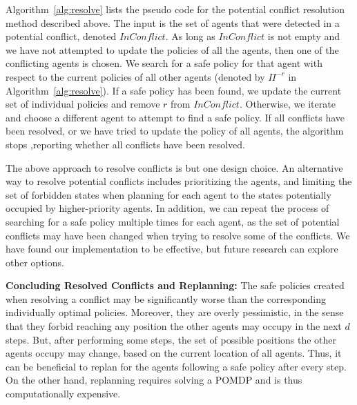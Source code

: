 \documentclass[letterpaper]{article} %
\newcommand{\inconflict}{\textit{InConflict}}
\newcommand{\roni}[1]{ }
\begin{document}
Algorithm~\ref{alg:resolve} lists the pseudo code for the potential conflict resolution method described above.
The input is the set of agents that were detected in a potential conflict, denoted $\inconflict$.
As long as $\inconflict$ is not empty and we have not attempted to update the policies of all the agents,
then one of the conflicting agents is chosen.
We search for a safe policy for that agent with respect to the current policies of all other agents (denoted by $\Pi^{-r}$ in Algorithm~\ref{alg:resolve}).
If a safe policy has been found, we update the current set of individual policies and remove $r$ from $\inconflict$.
Otherwise, we iterate and choose a different agent to attempt to find a safe policy.
If all conflicts have been resolved, or we have tried to update the policy of all agents, the algorithm stops ,reporting whether all conflicts have been resolved.
\roni{If space is an issue, consider removing the above paragraph and pseudo-code}





The above approach to resolve conflicts is but one design choice.
An alternative way to resolve potential conflicts includes prioritizing the agents, and limiting the set of forbidden states when planning for each agent to the states potentially occupied by higher-priority agents. In addition, we can repeat the process of searching for a safe policy multiple times for each agent, as the set of potential conflicts may have been changed when trying to resolve some of the conflicts. We have found our implementation to be effective, but future research can explore other options.


\noindent\textbf{Concluding Resolved Conflicts and Replanning:}
The safe policies created when resolving a conflict may be significantly worse than the corresponding individually optimal policies. Moreover, they are overly pessimistic, in the sense that they forbid reaching any position the other agents may occupy in the next $d$ steps. But, after performing some steps, the set of possible positions the other agents occupy may change, based on the current location of all agents. Thus, it can be beneficial to replan for the agents following a safe policy after every step. On the other hand, replanning requires solving a POMDP and is thus computationally expensive.
\end{document}
